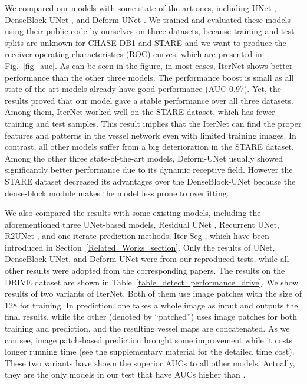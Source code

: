 \documentclass[10pt,twocolumn,letterpaper]{article}
\begin{document}
We compared our models with some state-of-the-art ones, including UNet \cite{UNet}, DenseBlock-UNet \cite{8697107, 8379359}, and Deform-UNet \cite{JIN2019}. We trained and evaluated these models using their public code by ourselves on three datasets, because training and test splits are unknown for CHASE-DB1 and STARE and we want to produce the receiver operating characteristics (ROC) curves, which are presented in Fig.~\ref{fig_auc}. As can be seen in the figure, in most cases, IterNet shows better performance than the other three models. The performance boost is small as all state-of-the-art models already have good performance (AUC  0.97). Yet, the results proved that our model gave a stable performance over all three datasets. Among them, IterNet worked well on the STARE dataset, which has fewer training and test samples. This result implies that the IterNet can find the proper features and patterns in the vessel network even with limited training images. In contrast, all other models suffer from a big deterioration in the STARE dataset. Among the other three state-of-the-art models, Deform-UNet usually showed significantly better performance due to its dynamic receptive field. However the STARE dataset decreased its advantages over the DenseBlock-UNet because the dense-block module makes the model less prone to overfitting.

We also compared the results with some existing models, including the aforementioned three UNet-based models, Residual UNet \cite{alom2018recurrent}, Recurrent UNet\cite{alom2018recurrent}, R2UNet \cite{alom2018recurrent}, and one iterate prediction methods, \ie Iter-Seg \cite{7042289}, which have been introduced in Section~\ref{Related_Works_section}. Only the results of UNet, DenseBlock-UNet, and Deform-UNet were from our reproduced tests, while all other results were adopted from the corresponding papers. The results on the DRIVE dataset are shown in Table~\ref{table_detect_performance_drive}. We show results of two variants of IterNet. Both of them use image patches with the size of 128 for training. In prediction, one takes a whole image as input and outputs the final results, while the other (denoted by ``patched'') uses image patches for both training and prediction, and the resulting vessel maps are concatenated. As we can see, image patch-based prediction brought some improvement while it costs longer running time (see the supplementary material for the detailed time cost). These two variants have shown the superior AUCs to all other models. Actually, they are the only models in our test that have AUCs higher than .
\end{document}
